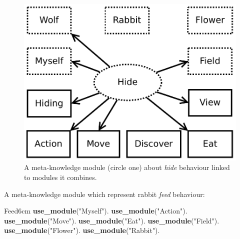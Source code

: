 \documentclass{aamas2012}
\begin{document}
	\begin{figure}
		\centering
		\includegraphics[keepaspectratio=true, scale=0.4]{hide.pdf}
		\caption
		{
			\label{hide_figure}
			A meta-knowledge module (circle one) about \emph{hide} behaviour linked to modules it combines.
		}
	\end{figure}
	
	\begin{example}
		\label{feed_example}
		A meta-knowledge module which represent rabbit \emph{feed} behaviour:\newline
		\begin{module}{Feed}{6cm}
			\textbf{use\_module}("Myself").\newline
			\textbf{use\_module}("Action").\newline
			\textbf{use\_module}("Move").\newline
			\textbf{use\_module}("Eat").\newline
			\textbf{use\_module}("Field").\newline
			\textbf{use\_module}("Flower").\newline
			\textbf{use\_module}("Rabbit").
		\end{module}
	\end{example}
	
\end{document}

